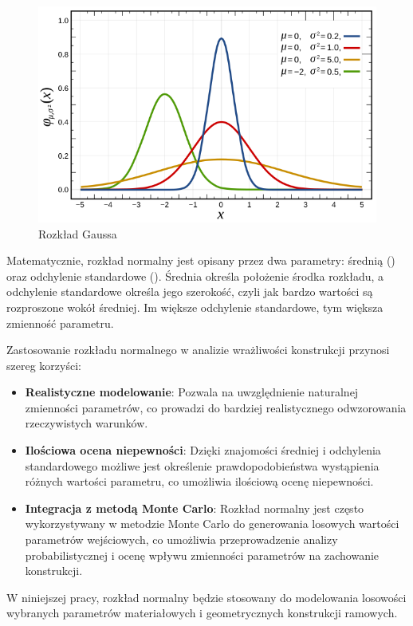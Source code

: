 \begin{figure}[H]
    \centering
    \includegraphics[scale=0.6]{images/Gauss}
    \caption{Rozkład Gaussa}
\end{figure}

Matematycznie, rozkład normalny jest opisany przez dwa parametry: średnią (\mu) oraz odchylenie standardowe (\sigma).
Średnia określa położenie środka rozkładu, a odchylenie standardowe określa jego szerokość, czyli jak bardzo wartości są rozproszone wokół średniej.
Im większe odchylenie standardowe, tym większa zmienność parametru.

Zastosowanie rozkładu normalnego w analizie wrażliwości konstrukcji przynosi szereg korzyści:

\begin{itemize}
    \item \textbf{Realistyczne modelowanie}: Pozwala na uwzględnienie naturalnej zmienności parametrów, co prowadzi do bardziej realistycznego odwzorowania rzeczywistych warunków.
    \item \textbf{Ilościowa ocena niepewności}: Dzięki znajomości średniej i odchylenia standardowego możliwe jest określenie prawdopodobieństwa wystąpienia różnych wartości parametru, co umożliwia ilościową ocenę niepewności.
    \item \textbf{Integracja z metodą Monte Carlo}: Rozkład normalny jest często wykorzystywany w metodzie Monte Carlo do generowania losowych wartości parametrów wejściowych, co umożliwia przeprowadzenie analizy probabilistycznej i ocenę wpływu zmienności parametrów na zachowanie konstrukcji.
\end{itemize}
W niniejszej pracy, rozkład normalny będzie stosowany do modelowania losowości wybranych parametrów materiałowych i geometrycznych konstrukcji ramowych.

